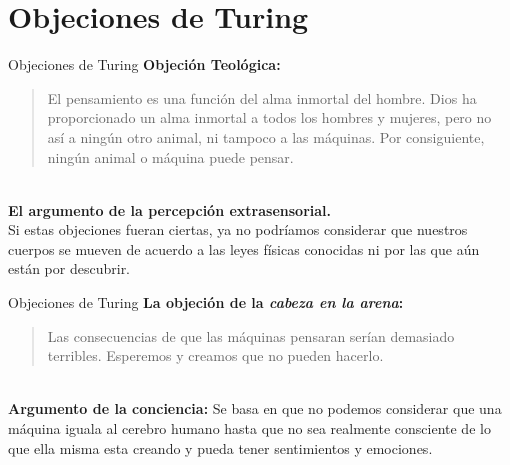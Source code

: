 \documentclass{beamer}
\begin{document}
\section{Objeciones de Turing}
\begin{frame}{Objeciones de Turing}
\textbf{Objeción Teológica:}
\begin{quote}\small El pensamiento es una función del alma inmortal del hombre. Dios ha proporcionado un alma inmortal a todos los hombres y mujeres, pero no así a ningún otro animal, ni tampoco a las máquinas. Por consiguiente, ningún animal o máquina puede pensar.\end{quote}\\
\vspace{8mm}
\textbf{El argumento de la percepción extrasensorial.}\\
Si estas objeciones fueran ciertas, ya no podríamos considerar que nuestros cuerpos se mueven de acuerdo a las leyes físicas conocidas ni por las que aún están por descubrir.
\end{frame}

\begin{frame}{Objeciones de Turing}
\textbf{La objeción de la \emph{cabeza en la arena}:}
\begin{quote}\small Las consecuencias de que las máquinas pensaran serían demasiado terribles. Esperemos y creamos que no pueden hacerlo.\end{quote}\\
\vspace{8mm}
\textbf{Argumento de la conciencia:}
Se basa en que no podemos considerar que una máquina iguala al cerebro humano hasta que no sea realmente consciente de lo que ella misma esta creando y pueda tener sentimientos y emociones.
\end{frame}
\end{document}
